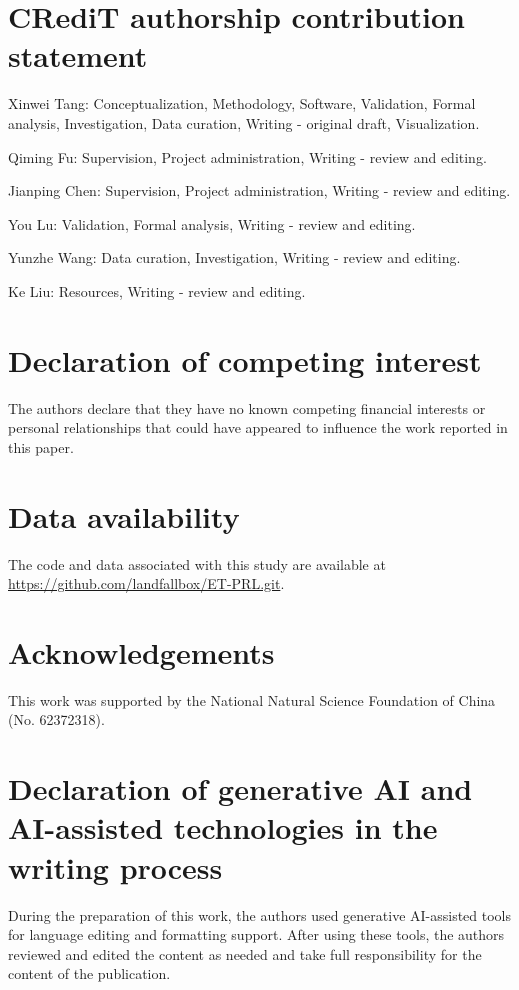 \documentclass[preprint,12pt,number]{elsarticle}
\begin{document}
\section*{CRediT authorship contribution statement}
Xinwei Tang: Conceptualization, Methodology, Software, Validation, Formal analysis, Investigation, Data curation, Writing - original draft, Visualization.

Qiming Fu: Supervision, Project administration, Writing - review and editing.

Jianping Chen: Supervision, Project administration, Writing - review and editing.

You Lu: Validation, Formal analysis, Writing - review and editing.

Yunzhe Wang: Data curation, Investigation, Writing - review and editing.

Ke Liu: Resources, Writing - review and editing.

\section*{Declaration of competing interest}
The authors declare that they have no known competing financial interests or personal relationships that could have appeared to influence the work reported in this paper.

\section*{Data availability}
The code and data associated with this study are available at \url{https://github.com/landfallbox/ET-PRL.git}.

\section*{Acknowledgements}
This work was supported by the National Natural Science Foundation of China (No. 62372318).

\section*{Declaration of generative AI and AI-assisted technologies in the writing process}
During the preparation of this work, the authors used generative AI-assisted tools for language editing and formatting support. After using these tools, the authors reviewed and edited the content as needed and take full responsibility for the content of the publication.
\end{document}
